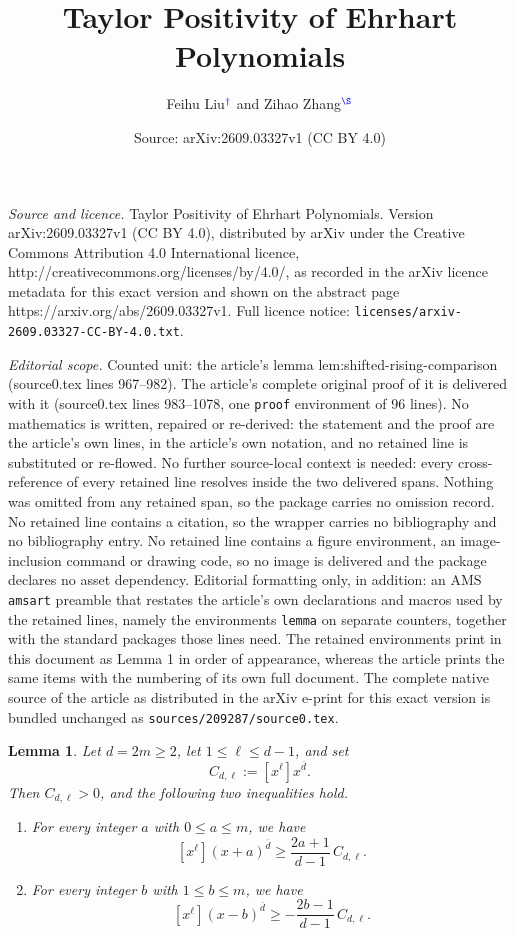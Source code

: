 \documentclass[10pt,a4paper]{amsart}
\title{Taylor Positivity of Ehrhart Polynomials}
\author{Feihu Liu$^{\color{blue} \dag}$ and Zihao Zhang$^{\color{blue} \S}$}
\date{Source: arXiv:2609.03327v1 (CC BY 4.0)}
\newtheorem{lemma}{Lemma}
\begin{document}
\maketitle

\noindent\emph{Source and licence.} Taylor Positivity of Ehrhart Polynomials. Version arXiv:2609.03327v1 (CC BY 4.0), distributed by arXiv under the Creative Commons Attribution 4.0 International licence, http://creativecommons.org/licenses/by/4.0/, as recorded in the arXiv licence metadata for this exact version and shown on the abstract page https://arxiv.org/abs/2609.03327v1. Full licence notice: \texttt{licenses/arxiv-2609.03327-CC-BY-4.0.txt}.\par\smallskip

\noindent\textit{Editorial scope.} Counted unit: the article's lemma lem:shifted-rising-comparison (source0.tex lines 967--982). The article's complete original proof of it is delivered with it (source0.tex lines 983--1078, one \texttt{proof} environment of 96 lines). No mathematics is written, repaired or re-derived: the statement and the proof are the article's own lines, in the article's own notation, and no retained line is substituted or re-flowed.  No further source-local context is needed: every cross-reference of every retained line resolves inside the two delivered spans.  Nothing was omitted from any retained span, so the package carries no omission record.  No retained line contains a citation, so the wrapper carries no bibliography and no bibliography entry.  No retained line contains a figure environment, an image-inclusion command or drawing code, so no image is delivered and the package declares no asset dependency.  Editorial formatting only, in addition: an AMS \texttt{amsart} preamble that restates the article's own declarations and macros used by the retained lines, namely the environments \texttt{lemma} on separate counters, together with the standard packages those lines need.  The retained environments print in this document as Lemma 1 in order of appearance, whereas the article prints the same items with the numbering of its own full document.  The complete native source of the article as distributed in the arXiv e-print for this exact version is bundled unchanged as \texttt{sources/209287/source0.tex}.
\begin{lemma}\label{lem:shifted-rising-comparison}
Let $d=2m\geq2$, let $1\leq\ell\leq d-1$, and set
\[C_{d,\ell}:=[x^\ell]x^{\overline d}.
\]
Then $C_{d,\ell}>0$, and the following two inequalities hold.
\begin{enumerate}
\item[(a)] For every integer $a$ with $0\leq a\leq m$, we have 
\begin{equation}\label{eq:positive-rising-shift}
[x^\ell](x+a)^{\overline d}\geq\frac{2a+1}{d-1}\,C_{d,\ell}.
\end{equation}
\item[(b)] For every integer $b$ with $1\leq b\leq m$, we have 
\begin{equation}\label{eq:negative-rising-shift}
[x^\ell](x-b)^{\overline d}\geq-\frac{2b-1}{d-1}\,C_{d,\ell}.
\end{equation}
\end{enumerate}
\end{lemma}
\end{document}
